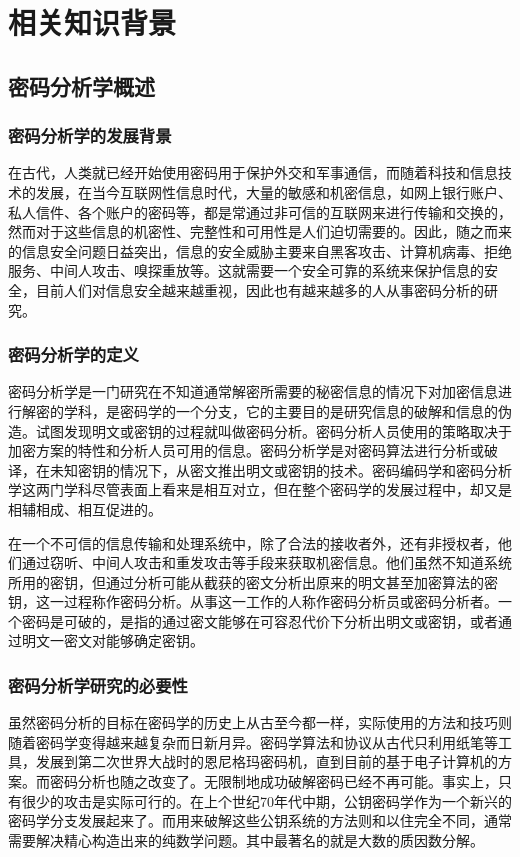 \chapter{相关知识背景}
\section{密码分析学概述}
\subsection{密码分析学的发展背景}
在古代，人类就已经开始使用密码用于保护外交和军事通信，而随着科技和信息技术的发展，在当今互联网性信息时代，大量的敏感和机密信息，如网上银行账户、私人信件、各个账户的密码等，都是常通过非可信的互联网来进行传输和交换的，然而对于这些信息的机密性、完整性和可用性是人们迫切需要的。因此，随之而来的信息安全问题日益突出，信息的安全威胁主要来自黑客攻击、计算机病毒、拒绝服务、中间人攻击、嗅探重放等。这就需要一个安全可靠的系统来保护信息的安全，目前人们对信息安全越来越重视，因此也有越来越多的人从事密码分析的研究。
\subsection{密码分析学的定义}
密码分析学是一门研究在不知道通常解密所需要的秘密信息的情况下对加密信息进行解密的学科，是密码学的一个分支，它的主要目的是研究信息的破解和信息的伪造。试图发现明文或密钥的过程就叫做密码分析。密码分析人员使用的策略取决于加密方案的特性和分析人员可用的信息。密码分析学是对密码算法进行分析或破译，在未知密钥的情况下，从密文推出明文或密钥的技术。密码编码学和密码分析学这两门学科尽管表面上看来是相互对立，但在整个密码学的发展过程中，却又是相辅相成、相互促进的。

在一个不可信的信息传输和处理系统中，除了合法的接收者外，还有非授权者，他们通过窃听、中间人攻击和重发攻击等手段来获取机密信息。他们虽然不知道系统所用的密钥，但通过分析可能从截获的密文分析出原来的明文甚至加密算法的密钥，这一过程称作密码分析\cite{feng01}。从事这一工作的人称作密码分析员或密码分析者。一个密码是可破的，是指的通过密文能够在可容忍代价下分析出明文或密钥，或者通过明文一密文对能够确定密钥。
\subsection{密码分析学研究的必要性}
虽然密码分析的目标在密码学的历史上从古至今都一样，实际使用的方法和技巧则随着密码学变得越来越复杂而日新月异。密码学算法和协议从古代只利用纸笔等工具，发展到第二次世界大战时的恩尼格玛密码机，直到目前的基于电子计算机的方案。而密码分析也随之改变了。无限制地成功破解密码已经不再可能。事实上，只有很少的攻击是实际可行的。在上个世纪70年代中期，公钥密码学作为一个新兴的密码学分支发展起来了。而用来破解这些公钥系统的方法则和以住完全不同，通常需要解决精心构造出来的纯数学问题。其中最著名的就是大数的质因数分解。

